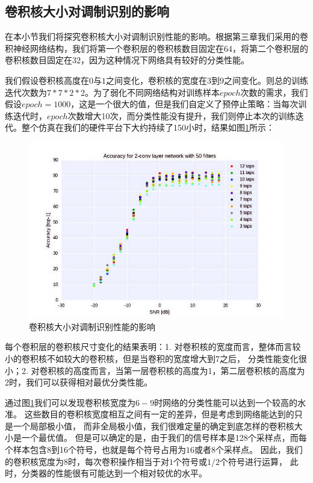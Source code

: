 \subsection{卷积核大小对调制识别的影响}
在本小节我们将探究卷积核大小对调制识别性能的影响。根据第三章我们采用的卷积神经网络结构，我们将第一个卷积层的卷积核数目固定在64，将第二个卷积层的卷积核数目固定在32，因为这种情况下网络具有较好的分类性能。\par
我们假设卷积核高度在$0$与$1$之间变化，卷积核的宽度在$3$到$9$之间变化。则总的训练迭代次数为$7 * 7 * 2 * 2$。为了弱化不同网络结构对训练样本$epoch$次数的需求，我们假设$epoch=1000$，这是一个很大的值，但是我们自定义了预停止策略：当每次训练迭代时，$epoch$次数增大10次，而分类性能没有提升，我们则停止本次的训练迭代。整个仿真在我们的硬件平台下大约持续了150小时，结果如图\ref{sec:fig_5_2}所示：\par
\begin{figure}[!h]
	\centering
	\includegraphics[scale=1.2]{figures/chapter_5/fig_5_2}
	\caption{卷积核大小对调制识别性能的影响}\label{sec:fig_5_2}
\end{figure}
每个卷积层的卷积核尺寸变化的结果表明：1. 对卷积核的宽度而言，整体而言较小的卷积核不如较大的卷积核，但是当卷积的宽度增大到7之后，
分类性能变化很小；2. 对卷积核的高度而言，当第一层卷积核的高度为1，第二层卷积核的高度为2时，我们可以获得相对最优分类性能。\par

通过图\ref{sec:fig_5_2}我们可以发现卷积核宽度为$6-9$时网络的分类性能可以达到一个较高的水准。
这些数目的卷积核宽度相互之间有一定的差异，但是考虑到网络能达到的只是一个局部极小值，
而非全局极小值，我们很难定量的确定到底怎样的卷积核大小是一个最优值。
但是可以确定的是，由于我们的信号样本是128个采样点，而每个样本包含8到16个符号，也就是每个符号占用为$16$或者$8$个采样点。
因此，我们的卷积核宽度为$8$时，每次卷积操作相当于对$1$个符号或$1/2$个符号进行运算，
此时，分类器的性能很有可能达到一个相对较优的水平。\par

